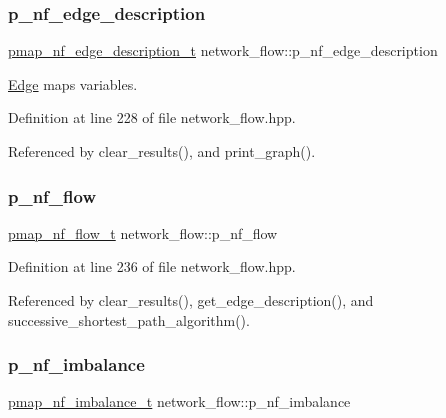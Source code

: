 \subsubsection{\texorpdfstring{p\+\_\+nf\+\_\+edge\+\_\+description}{p\_nf\_edge\_description}}
{\footnotesize\ttfamily \hyperlink{classnetwork__flow_a1ea6b2ccbcafb4ecd4d6fb0e64b53350}{pmap\+\_\+nf\+\_\+edge\+\_\+description\+\_\+t} network\+\_\+flow\+::p\+\_\+nf\+\_\+edge\+\_\+description}



\hyperlink{structEdge}{Edge} maps variables. 



Definition at line 228 of file network\+\_\+flow.\+hpp.



Referenced by clear\+\_\+results(), and print\+\_\+graph().

\mbox{\label{classnetwork__flow_ad5848d314290ca974af12d892f200bea}} 
\subsubsection{\texorpdfstring{p\+\_\+nf\+\_\+flow}{p\_nf\_flow}}
{\footnotesize\ttfamily \hyperlink{classnetwork__flow_ab39a2916cb880c6ee352ff76b2378514}{pmap\+\_\+nf\+\_\+flow\+\_\+t} network\+\_\+flow\+::p\+\_\+nf\+\_\+flow}



Definition at line 236 of file network\+\_\+flow.\+hpp.



Referenced by clear\+\_\+results(), get\+\_\+edge\+\_\+description(), and successive\+\_\+shortest\+\_\+path\+\_\+algorithm().

\mbox{\label{classnetwork__flow_a30967a48a78946a8a69ccb96a97c71eb}} 
\subsubsection{\texorpdfstring{p\+\_\+nf\+\_\+imbalance}{p\_nf\_imbalance}}
{\footnotesize\ttfamily \hyperlink{classnetwork__flow_a5760a4393bb7caf9af993443e209de05}{pmap\+\_\+nf\+\_\+imbalance\+\_\+t} network\+\_\+flow\+::p\+\_\+nf\+\_\+imbalance}



